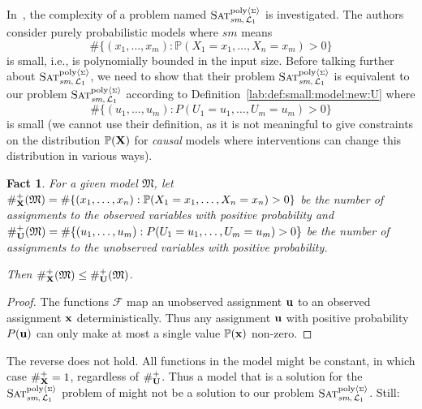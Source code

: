 \documentclass[a4paper,UKenglish,cleveref, autoref, thm-restate]{lipics-v2021}
\newtheorem{fact}[equation]{Fact}
\newcommand{\compactEquals}[1]{\let\IsInPP=1#1\let\IsInPP=\relax}
\newcommand{\PP}[1]{\mathbb{P}(\compactEquals{#1})}
\newcommand{\cF}{{\mathcal F}}
\newcommand{\fM}{{\mathfrak M}}
\newcommand{\bU}{{\bf U}}
\newcommand{\bX}{{\bf X}}
\newcommand{\bu}{{\bf u}}
\newcommand{\bx}{{\bf x}}
\def\probsumname#1#2{^{\text{#1}{\langle{\scriptscriptstyle\Sigma}\rangle}}_{\text{#2}}}
\newcommand{\SATprobpolysumsm}{\mbox{\sc Sat}\probsumname{poly}{\textit{sm},\,${\cal L}_1$}}
\begin{document}
In~\citep{blaser2024existential}, the complexity of a problem named $\SATprobpolysumsm$ is investigated. 
The authors consider purely probabilistic models where $sm$ means $$\#\{(x_1,\ldots,x_m): \mathbb{P}(X_1=x_1,\ldots, X_n=x_m) > 0\}$$ is small, i.e., is polynomially bounded in the input size. 
Before talking further about $\SATprobpolysumsm$, we need to show that their problem $\SATprobpolysumsm$ is equivalent to our problem $\SATprobpolysumsm$ according to Definition~\ref{lab:def:small:model:new:U} where $$\#\{(u_1,\ldots,u_m): P(U_1=u_1,\ldots, U_m=u_m) > 0\}$$ is small (we cannot use their definition, as it is not meaningful to give constraints on the distribution $\mathbb{P}(\bX)$ for \emph{causal} models where interventions can change this distribution in various ways).  

\newcommand{\countPosU}[1]{\#_\bU^+(#1)}
\newcommand{\countPosX}[1]{\#_\bX^+(#1)}

\begin{fact}\label{fact:small:model:observed:below:unobserved}
For a given model $\fM$, let $\countPosX{\fM} = \#\{(x_1,\ldots,x_n): \PP{X_1=x_1,\ldots, X_n=x_n} > 0\}$ be the number of assignments to the observed variables with positive probability and $\countPosU{\fM}= \#\{(u_1,\ldots,u_m): P(U_1=u_1,\ldots, U_m=u_m) > 0\}$ be the number of assignments to the unobserved variables with positive probability.

Then $\countPosX{\fM} \leq \countPosU{\fM}$.
\end{fact}
\begin{proof}
The functions $\cF$ map an unobserved assignment $\bu$ to an observed assignment $\bx$ deterministically. 
Thus any assignment $\bu$ with positive probability $P(\bu)$ can only make at most a single value $\PP{\bx}$ non-zero.
\end{proof}
The reverse does not hold. All functions in the model might be constant, in which case $\#_\bX^+ = 1$, regardless of $\#_\bU^+$. 
Thus a model that is a solution for the $\SATprobpolysumsm$ problem of \citep{blaser2024existential} might not be a solution to our problem $\SATprobpolysumsm$.
Still:
\end{document}
